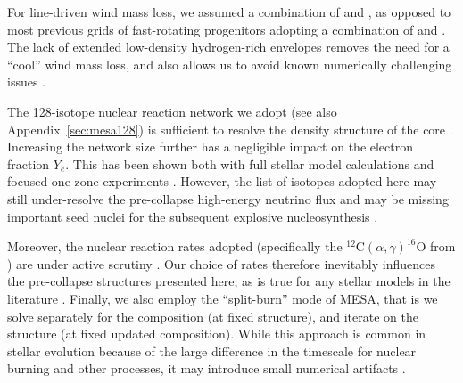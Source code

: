 \documentclass[%
trackchanges,twocolumn]{aastex701}
\begin{document}
For line-driven wind mass loss, we assumed a combination of
\cite{vink:00, vink:01} and \cite{nugis:00}, as opposed to most
previous grids of fast-rotating progenitors adopting a combination of
\cite{nieuwenhuijzen:90} \citep[e.g.,][]{woosley:06} and
\cite{hamann:95} \citep[e.g.,][]{aguilera-dena:18, aguilera-dena:20}.
The lack of extended low-density hydrogen-rich envelopes
  removes the need for a ``cool'' wind mass loss, and also allows us
  to avoid known numerically challenging issues
  \citep[e.g.,][]{paxton:13, cheng:24}.


The 128-isotope nuclear reaction network we adopt (see also
Appendix~\ref{sec:mesa128}) is sufficient to resolve the density
structure of the core \citep[e.g.,][]{farmer:16}. Increasing the
network size further has a negligible impact on the electron fraction
$Y_{e}$. This has been shown both with full stellar model calculations
\citep[e.g.,][]{farmer:16} and focused one-zone experiments
\citep[e.g.,][]{grichener:25}. However, the list of isotopes adopted
here may still under-resolve the pre-collapse high-energy neutrino
flux \citep[e.g.,][]{patton:17, farag:20, myers:26} and may be
  missing important seed nuclei for the subsequent explosive
nucleosynthesis \citep[e.g.,][]{nomoto:86, hix:96, thielemann:96,
  woosley:02, yoshida:05, woosley:07, farmer:23, limongi:25}.

Moreover, the nuclear reaction rates adopted (specifically the
$^{12}\mathrm{C}(\alpha,\gamma)^{16}\mathrm{O}$ from
\citealt{kunz:02}) are under active scrutiny
\citep[e.g.,][]{deboer:17, takahashi:18, farmer:19, costa:21, woosley:21, shen:23,
  noll:25, tong:26}. Our choice of rates therefore inevitably
influences the pre-collapse structures presented here, as is true for
any stellar models in the literature \citep[see also][]{fields:18}.
Finally, we also employ the ``split-burn'' mode of \textsc{MESA}, that
is we solve separately for the composition (at fixed structure), and
iterate on the structure (at fixed updated composition). While this
approach is common in stellar evolution because of the large
difference in the timescale for nuclear burning and other processes,
it may introduce small numerical artifacts
\citep[e.g.,][]{takahashi:13, farmer:16,
  jermyn:23, limongi:24, limongi:25}.
\end{document}
